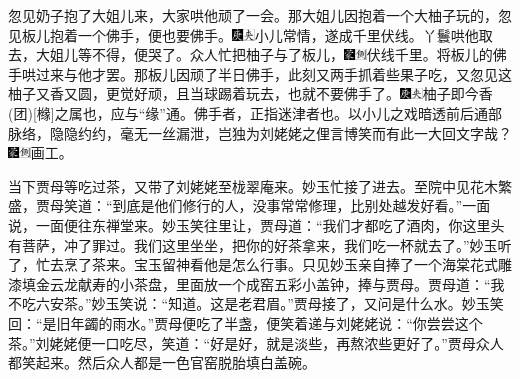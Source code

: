 忽见奶子抱了大姐儿来，大家哄他顽了一会。那大姐儿因抱着一个大柚子玩的，忽见板儿抱着一个佛手，便也要佛手。{\includegraphics[width=3mm]{../Images/00004}\includegraphics[width=3mm]{../Images/00012}\footnotesize \kaishu 小儿常情，遂成千里伏线。}丫鬟哄他取去，大姐儿等不得，便哭了。众人忙把柚子与了板儿，{\includegraphics[width=3mm]{../Images/00006}\includegraphics[width=3mm]{../Images/00011}\footnotesize \kaishu 伏线千里。}将板儿的佛手哄过来与他才罢。那板儿因顽了半日佛手，此刻又两手抓着些果子吃，又忽见这柚子又香又圆，更觉好顽，且当球踢着玩去，也就不要佛手了。{\includegraphics[width=3mm]{../Images/00004}\includegraphics[width=3mm]{../Images/00012}\footnotesize \kaishu 柚子即今香{(团)}{[}橼{]}之属也，应与“缘”通。佛手者，正指迷津者也。以小儿之戏暗透前后通部脉络，隐隐约约，毫无一丝漏泄，岂独为刘姥姥之俚言博笑而有此一大回文字哉？　\includegraphics[width=3mm]{../Images/00006}\includegraphics[width=3mm]{../Images/00011}\footnotesize \kaishu 画工。}

当下贾母等吃过茶，又带了刘姥姥至栊翠庵来。妙玉忙接了进去。至院中见花木繁盛，贾母笑道：“到底是他们修行的人，没事常常修理，比别处越发好看。”一面说，一面便往东禅堂来。妙玉笑往里让，贾母道：“我们才都吃了酒肉，你这里头有菩萨，冲了罪过。我们这里坐坐，把你的好茶拿来，我们吃一杯就去了。”妙玉听了，忙去烹了茶来。宝玉留神看他是怎么行事。只见妙玉亲自捧了一个海棠花式雕漆填金云龙献寿的小茶盘，里面放一个成窑五彩小盖钟，捧与贾母。贾母道：“我不吃六安茶。”妙玉笑说：“知道。这是老君眉。”贾母接了，又问是什么水。妙玉笑回：“是旧年蠲的雨水。”贾母便吃了半盏，便笑着递与刘姥姥说：“你尝尝这个茶。”刘姥姥便一口吃尽，笑道：“好是好，就是淡些，再熬浓些更好了。”贾母众人都笑起来。然后众人都是一色官窑脱胎填白盖碗。

